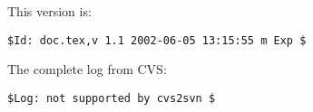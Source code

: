 \documentclass[a4paper,11pt,oneside]{scrartcl}
\begin{document}
\begin{flushleft} %
This version is:
\end{flushleft}

\begin{verbatim}
$Id: doc.tex,v 1.1 2002-06-05 13:15:55 m Exp $
\end{verbatim}

\begin{flushleft} %
The complete log from CVS:
\end{flushleft}

\begin{verbatim}
$Log: not supported by cvs2svn $
\end{verbatim}



\newpage



\printindex
\end{document}
